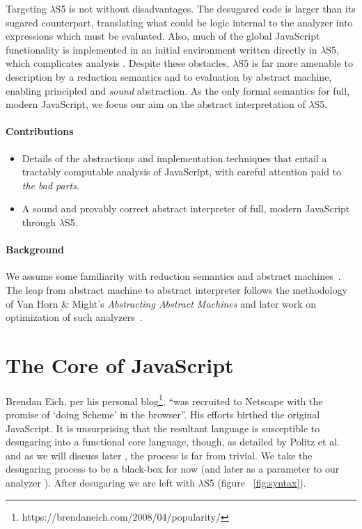 \documentclass[preprint,9pt]{sigplanconf} %
\begin{document}
Targeting $\lambda$S5 is not without disadvantages. The desugared code
is larger than its sugared counterpart, translating what could be
logic internal to the analyzer into expressions which must be
evaluated. Also, much of the global JavaScript functionality is
implemented in an initial environment written directly in $\lambda$S5,
which complicates analysis . Despite
these obstacles, $\lambda$S5 is far more amenable to description
by a reduction semantics and to evaluation by abstract machine,
enabling principled and \emph{sound} abstraction. As the only formal
semantics for full, modern JavaScript, we focus our aim on the
abstract interpretation of $\lambda$S5.

\paragraph{Contributions}
\begin{itemize}
\item Details of the abstractions and implementation techniques that
  entail a tractably computable analysis of JavaScript, with careful
  attention paid to \emph{the bad parts}.
\item A sound and provably correct abstract interpreter of full,
  modern JavaScript through $\lambda$S5.
\end{itemize}

\paragraph{Background}
We assume some familiarity with reduction semantics and abstract
machines~\cite{felleisen1986control,felleisen2009semantics}. The leap
from abstract machine to abstract interpreter follows the methodology
of Van Horn \& Might's \emph{Abstracting Abstract Machines} and later
work on optimization of such analyzers~\cite{van2010abstracting,
  DBLP:journals/corr/abs-1211-3722}.

\section{The Core of JavaScript}
Brendan Eich, per his personal
blog\footnote{https://brendaneich.com/2008/04/popularity/}, ``was
recruited to Netscape with the promise of `doing Scheme' in the
browser''. His efforts birthed the original JavaScript. It is
unsurprising that the resultant language is susceptible to desugaring
into a functional core language, though, as detailed by Politz et
al.~\cite{Politz:2012:TSG:2480360.2384579} and as we will discuss
later , the process is far from
trivial. We take the desugaring process to be a black-box for now
(and later as a parameter to our analyzer ).  After desugaring we are left with $\lambda$S5 (figure
~\ref{fig:syntax}).
\end{document}
